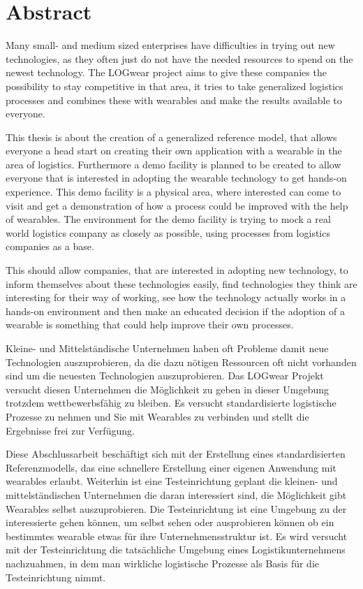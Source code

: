 \chapter*{Abstract}
Many small- and medium sized enterprises have difficulties in trying out new technologies, as they often just do not have the needed resources to spend on the newest technology. The LOGwear project aims to give these companies the possibility to stay competitive in that area, it tries to take generalized logistics processes and combines these with wearables and make the results available to everyone.

This thesis is about the creation of a generalized reference model, that allows everyone a head start on creating their own application with a wearable in the area of logistics. Furthermore a demo facility is planned to be created to allow everyone that is interested  in adopting the wearable technology to get hands-on experience. This demo facility is a physical area, where interested can come to visit and get a demonstration of how a process could be improved with the help of wearables. The environment for the demo facility is trying to mock a real world logistics company as closely as possible, using processes from logistics companies as a base.

This should allow companies, that are interested in adopting new technology, to inform themselves about these technologies easily, find technologies they think are interesting for their way of working, see how the technology actually works in a hands-on environment and then make an educated decision if the adoption of a wearable is something that could help improve their own processes.

\vspace{2cm}

Kleine- und Mittelständische Unternehmen haben oft Probleme damit neue Technologien auszuprobieren, da die dazu nötigen Ressourcen oft nicht vorhanden sind um die neuesten Technologien auszuprobieren. Das LOGwear Projekt versucht diesen Unternehmen die Möglichkeit zu geben in dieser Umgebung trotzdem wettbewerbsfähig zu bleiben. Es versucht standardisierte logistische Prozesse zu nehmen und Sie mit Wearables zu verbinden und stellt die Ergebnisse frei zur Verfügung.

Diese Abschlussarbeit beschäftigt sich mit der Erstellung eines standardisierten Referenzmodells, das eine schnellere Erstellung einer eigenen Anwendung mit wearables erlaubt. Weiterhin ist eine Testeinrichtung geplant die kleinen- und mittelständischen Unternehmen die daran interessiert sind, die Möglichkeit gibt  Wearables selbst auszuprobieren. Die Testeinrichtung ist eine Umgebung zu der interessierte gehen können, um selbst sehen oder ausprobieren können ob ein bestimmtes wearable etwas für ihre Unternehmensstruktur ist. Es wird versucht mit der Testeinrichtung die tatsächliche Umgebung eines Logistikunternehmens nachzuahmen, in dem man wirkliche logistische Prozesse als Basis für die Testeinrichtung nimmt.


